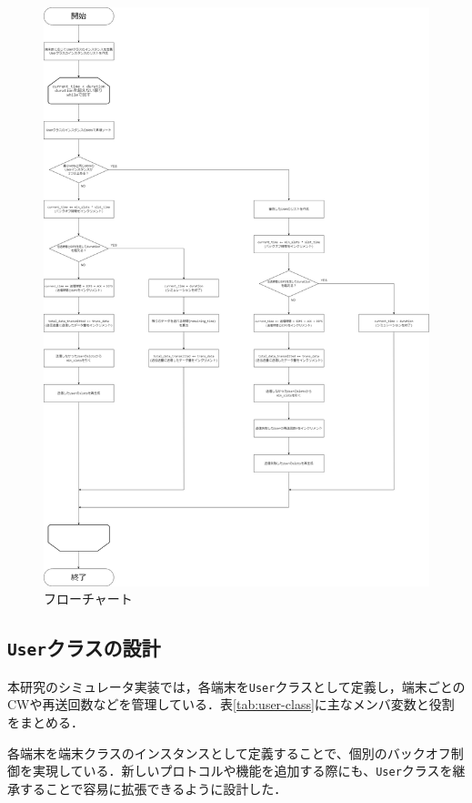\documentclass[a4paper,10pt]{ltjsarticle}
\begin{document}
\begin{figure}[H]
  \centering
  \includegraphics[width=1\textwidth]{./assets/flowchart.drawio.png}
  \caption{フローチャート}
  \label{flowchart}
\end{figure}



\subsection{\texttt{User}クラスの設計}
本研究のシミュレータ実装では，各端末を\texttt{User}クラスとして定義し，端末ごとのCWや再送回数などを管理している．表\ref{tab:user-class}に主なメンバ変数と役割をまとめる．

各端末を端末クラスのインスタンスとして定義することで、個別のバックオフ制御を実現している．新しいプロトコルや機能を追加する際にも、\texttt{User}クラスを継承することで容易に拡張できるように設計した．
\end{document}
